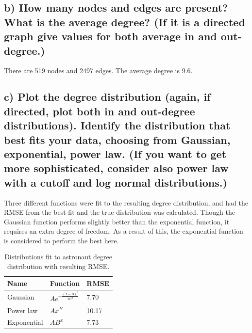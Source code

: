 \documentclass{tufte-handout}
\begin{document}
\subsection{b) How many nodes and edges are present? What is the average degree? (If it is a directed graph give values for both average in and out-degree.)}

There are 519 nodes and 2497 edges. The average degree is 9.6.

\subsection{c) Plot the degree distribution (again, if directed, plot both in and out-degree distributions). Identify the distribution that best fits your data, choosing from Gaussian, exponential, power law. (If you want to get more sophisticated, consider also power law with a cutoff and log normal distributions.)}

Three different functions were fit to the resulting degree distribution, and had the RMSE from the best fit and the true distribution was calculated. Though the Gaussian function performs slightly better than the exponential function, it requires an extra degree of freedom. As a result of this, the exponential function is considered to perform the best here.

\begin{table}[ht]
  \centering
  \selectfont
  \begin{tabular}{lll}
    \toprule
    Name & Function & RMSE \\
    \midrule
    Gaussian    & $A e^{- { \frac{(x-B)^2 }{ 2 C^2} } }$ & 7.70 \\
    Power law   & $A x^B$ & 10.17 \\
    Exponential & $A B^x$ & 7.73 \\
    \bottomrule
  \end{tabular}
  \caption{Distributions fit to astronaut degree distribution with resulting RMSE.}
  \label{tab:normaltab}
\end{table}
\end{document}

